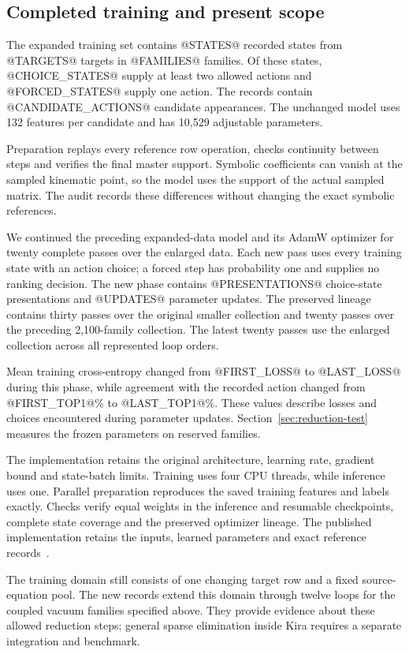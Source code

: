 \subsection{Completed training and present scope}
The expanded training set contains @STATES@ recorded states from
@TARGETS@ targets in @FAMILIES@ families. Of these states,
@CHOICE_STATES@ supply at least two allowed actions and
@FORCED_STATES@ supply one action. The records contain
@CANDIDATE_ACTIONS@ candidate appearances. The unchanged model
uses 132 features per candidate and has 10,529 adjustable parameters.

Preparation replays every reference row operation, checks continuity
between steps and verifies the final master support. Symbolic
coefficients can vanish at the sampled kinematic point, so the model
uses the support of the actual sampled matrix. The audit records
these differences without changing the exact symbolic references.

We continued the preceding expanded-data model and its AdamW
optimizer for twenty complete passes over the enlarged data. Each new pass
uses every training state with an action choice; a forced step has
probability one and supplies no ranking decision. The new phase
contains @PRESENTATIONS@ choice-state presentations and
@UPDATES@ parameter updates. The preserved lineage contains thirty
passes over the original smaller collection and twenty passes over
the preceding 2,100-family collection. The latest twenty passes
use the enlarged collection across all represented loop orders.

Mean training cross-entropy changed from @FIRST_LOSS@ to
@LAST_LOSS@ during this phase, while agreement with the recorded
action changed from @FIRST_TOP1@\% to @LAST_TOP1@\%.
These values describe losses and choices encountered during
parameter updates. Section~\ref{sec:reduction-test} measures the
frozen parameters on reserved families.

The implementation retains the original architecture, learning rate,
gradient bound and state-batch limits. Training uses four CPU threads,
while inference uses one. Parallel preparation reproduces the saved
training features and labels exactly. Checks verify equal weights
in the inference and resumable checkpoints, complete state coverage
and the preserved optimizer lineage. The published implementation
retains the inputs, learned parameters and exact reference
records~\cite{ReductionModelData}.

The training domain still consists of one changing target row and a
fixed source-equation pool. The new records extend this domain
through twelve loops for the coupled vacuum families specified
above. They provide evidence about these allowed reduction steps;
general sparse elimination inside Kira requires a separate
integration and benchmark.
